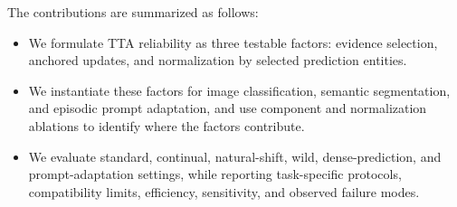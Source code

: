 The contributions are summarized as follows:
\begin{itemize}
\setlength{\itemsep}{2pt}
\setlength{\parsep}{0pt}
\setlength{\parskip}{0pt}
\setlength{\topsep}{3pt}
\setlength{\partopsep}{0pt}
\item We formulate TTA reliability as three testable factors: evidence selection, anchored updates, and normalization by selected prediction entities.
\item We instantiate these factors for image classification, semantic segmentation, and episodic prompt adaptation, and use component and normalization ablations to identify where the factors contribute.
\item We evaluate standard, continual, natural-shift, wild, dense-prediction, and prompt-adaptation settings, while reporting task-specific protocols, compatibility limits, efficiency, sensitivity, and observed failure modes.
\end{itemize}
